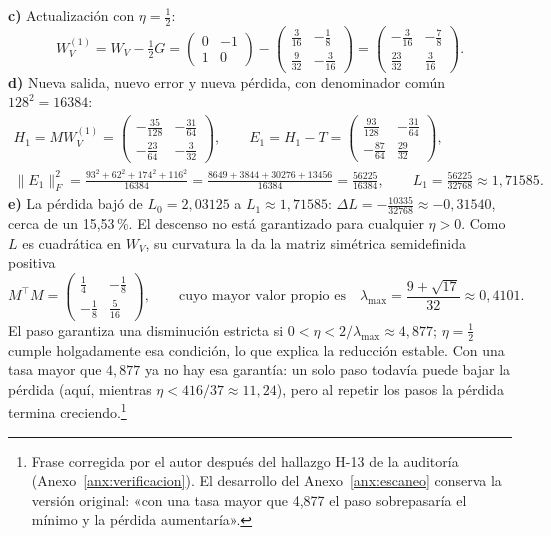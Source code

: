 \documentclass[10pt]{article}
\begin{document}
\textbf{c)} Actualización con $\eta=\tfrac12$:
\[
  W_V^{(1)} = W_V - \tfrac12G
  = \begin{pmatrix}0&-1\\1&0\end{pmatrix} - \begin{pmatrix}\frac3{16}&-\frac18\\[0.3ex]\frac9{32}&-\frac3{16}\end{pmatrix}
  = \begin{pmatrix}-\frac3{16}&-\frac78\\[0.3ex]\frac{23}{32}&\frac3{16}\end{pmatrix}.
\]
\textbf{d)} Nueva salida, nuevo error y nueva pérdida, con denominador común $128^2 = 16384$:
\begin{gather*}
  H_1 = MW_V^{(1)} = \begin{pmatrix}-\frac{35}{128}&-\frac{31}{64}\\[0.3ex]-\frac{23}{64}&-\frac3{32}\end{pmatrix},\qquad
  E_1 = H_1 - T = \begin{pmatrix}\frac{93}{128}&-\frac{31}{64}\\[0.3ex]-\frac{87}{64}&\frac{29}{32}\end{pmatrix},\\
  \|E_1\|_F^2 = \frac{93^2+62^2+174^2+116^2}{16384} = \frac{8649+3844+30276+13456}{16384} = \frac{56225}{16384},
  \qquad L_1 = \frac{56225}{32768}\approx 1{,}71585 .
\end{gather*}
\textbf{e)} La pérdida bajó de $L_0 = 2{,}03125$ a $L_1\approx1{,}71585$: $\Delta L = -\tfrac{10335}{32768}
\approx -0{,}31540$, cerca de un 15,53\,\%. El descenso no está garantizado para cualquier $\eta>0$. Como
$L$ es cuadrática en $W_V$, su curvatura la da la matriz simétrica semidefinida positiva
\[
  M^\top M = \begin{pmatrix}\frac14&-\frac18\\[0.3ex]-\frac18&\frac5{16}\end{pmatrix},
  \qquad\text{cuyo mayor valor propio es}\quad \lambda_{\max} = \frac{9+\sqrt{17}}{32}\approx0{,}4101 .
\] El paso garantiza una disminución estricta si
$0<\eta<2/\lambda_{\max}\approx4{,}877$; $\eta = \tfrac12$ cumple holgadamente esa condición, lo que
explica la reducción estable. Con una tasa mayor que $4{,}877$ ya no hay esa garantía: un solo paso
todavía puede bajar la pérdida (aquí, mientras $\eta<416/37\approx11{,}24$), pero al repetir los pasos la
pérdida termina creciendo.\footnote{Frase corregida por el autor después del hallazgo H-13 de la
auditoría (Anexo~\ref{anx:verificacion}). El desarrollo del Anexo~\ref{anx:escaneo} conserva la versión
original: «con una tasa mayor que 4,877 el paso sobrepasaría el mínimo y la pérdida aumentaría».}
\end{document}

